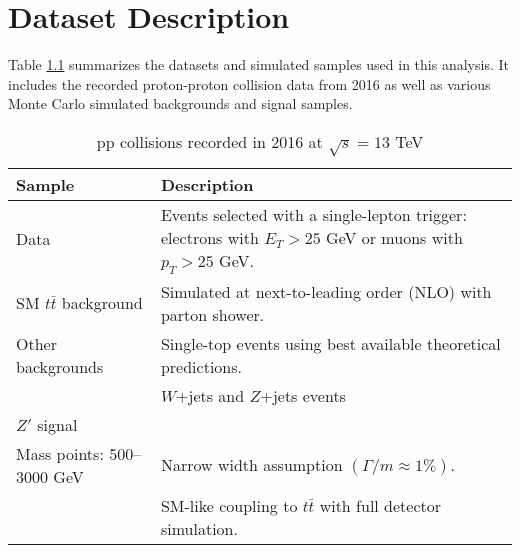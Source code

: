 \chapter{Dataset Description}\label{ch2}
Table \ref{tab:data_sim_samples} summarizes the datasets and simulated samples used in this analysis. It includes the recorded proton-proton collision data from 2016 as well as various Monte Carlo simulated backgrounds and signal samples.

\renewcommand{\arraystretch}{1.3} %
\begin{table}[h!]
\centering
\caption{pp collisions recorded in 2016 at \(\sqrt{s} = 13\) TeV}
\label{tab:data_sim_samples}
\begin{tabular}{@{}l p{8cm}@{}}
\toprule
\textbf{Sample} & \textbf{Description} \\ \midrule
Data & Events selected with a single-lepton trigger: electrons with \(E_T > 25\) GeV or muons with \(p_T > 25\) GeV. \\[6pt]

SM \(t\bar{t}\) background & Simulated at next-to-leading order (NLO) with parton shower. \\

Other backgrounds & Single-top events using best available theoretical predictions. \\
                       & \(W\)+jets and \(Z\)+jets events \\

\(Z'\) signal & \\ 
Mass points: 500–3000 GeV & Narrow width assumption \((\Gamma / m \approx 1\%)\). \\
                       & SM-like coupling to \(t\bar{t}\) with full detector simulation. \\
\bottomrule
\end{tabular}
\end{table}








